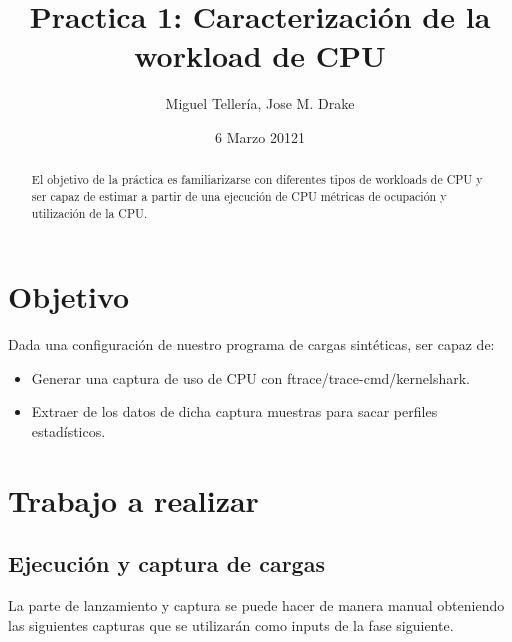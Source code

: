 \documentclass[a4paper,11pt,spanish,twoside]{article}
\begin{document}
\title{Practica 1:  Caracterización de la workload de CPU}

\author{Miguel Tellería, Jose M. Drake}

\date{6 Marzo 20121}

\maketitle
\thispagestyle{empty} %

\begin{abstract}

El objetivo de la práctica es familiarizarse con diferentes tipos de
workloads de CPU y ser capaz de estimar a partir de una ejecución de
CPU métricas de ocupación y utilización de la CPU.

\end{abstract}

\section{Objetivo}
\label{sec:objetivo}

Dada una configuración de nuestro programa de cargas sintéticas, ser
capaz de:

\begin{itemize}
\item Generar una captura de uso de CPU con ftrace/trace-cmd/kernelshark.

\item Extraer de los datos de dicha captura muestras para sacar
  perfiles estadísticos.

\end{itemize}

\section{Trabajo a realizar}
\label{sec:trabajo}

\subsection{Ejecución y captura de cargas}
\label{sec:ejecucionycaptura}

La parte de lanzamiento y captura se puede hacer de manera manual
obteniendo las siguientes capturas que se utilizarán como inputs de la
fase siguiente.
\end{document}
